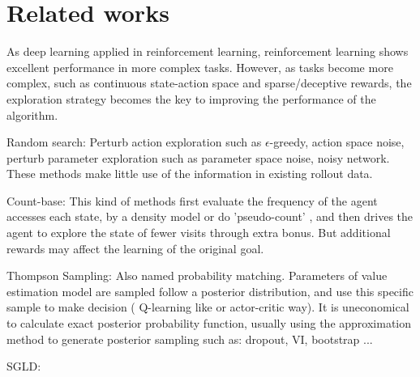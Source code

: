 \section{Related works}
As deep learning applied in reinforcement learning, reinforcement learning shows excellent performance in more complex tasks. However, as tasks become more complex, such as continuous state-action space and sparse/deceptive rewards, the exploration strategy becomes the key to improving the performance of the algorithm.

Random search: Perturb action exploration such as $\epsilon$-greedy, action space noise, perturb parameter exploration such as parameter space noise, noisy network. These methods make little use of the information in existing rollout data.

Count-base: This kind of methods first evaluate the frequency of the agent accesses each state, by a density model or do 'pseudo-count' , and then drives the agent to explore the state of fewer visits through extra bonus. But additional rewards may affect the learning of the original goal.

Thompson Sampling: Also named probability matching. Parameters of value estimation model are sampled follow a posterior distribution, and use this specific sample to make decision ( Q-learning like or actor-critic way). It is uneconomical to calculate exact posterior probability function, usually using the approximation method to generate posterior sampling such as: dropout, VI, bootstrap ...

SGLD: